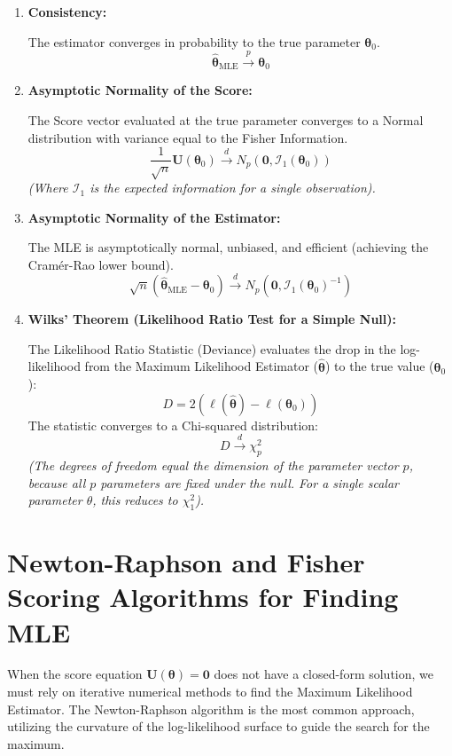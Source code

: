 \documentclass[
  letterpaper,
  DIV=11,
  numbers=noendperiod]{scrreprt}
\renewcommand{\[}{\begin{equation}}
\renewcommand{\]}{\end{equation}}
\theoremstyle{definition}
\theoremstyle{plain}
\theoremstyle{plain}
\theoremstyle{plain}
\theoremstyle{definition}
\theoremstyle{plain}
\theoremstyle{remark}
\begin{document}
\begin{enumerate}
\def\labelenumi{\arabic{enumi}.}
\item
  \textbf{Consistency:}

  The estimator converges in probability to the true parameter
  \(\boldsymbol{\theta}_0\). \[
   \hat{\boldsymbol{\theta}}_{\text{MLE}} \xrightarrow{p} \boldsymbol{\theta}_0
   \]
\item
  \textbf{Asymptotic Normality of the Score:}

  The Score vector evaluated at the true parameter converges to a Normal
  distribution with variance equal to the Fisher Information. \[
   \frac{1}{\sqrt{n}} \mathbf{U}(\boldsymbol{\theta}_0) \xrightarrow{d} N_p(\mathbf{0}, \mathcal{I}_1(\boldsymbol{\theta}_0))
   \] \emph{(Where \(\mathcal{I}_1\) is the expected information for a
  single observation).}
\item
  \textbf{Asymptotic Normality of the Estimator:}

  The MLE is asymptotically normal, unbiased, and efficient (achieving
  the Cramér-Rao lower bound). \[
   \sqrt{n}(\hat{\boldsymbol{\theta}}_{\text{MLE}} - \boldsymbol{\theta}_0) \xrightarrow{d} N_p(\mathbf{0}, \mathcal{I}_1(\boldsymbol{\theta}_0)^{-1})
   \]
\item
  \textbf{Wilks' Theorem (Likelihood Ratio Test for a Simple Null):}

  The Likelihood Ratio Statistic (Deviance) evaluates the drop in the
  log-likelihood from the Maximum Likelihood Estimator
  (\(\hat{\boldsymbol{\theta}}\)) to the true value
  (\(\boldsymbol{\theta}_0\)): \[
   D = 2 \left( \ell(\hat{\boldsymbol{\theta}}) - \ell(\boldsymbol{\theta}_0) \right)
   \] The statistic converges to a Chi-squared distribution: \[
   D \xrightarrow{d} \chi^2_{p}
   \] \emph{(The degrees of freedom equal the dimension of the parameter
  vector \(p\), because all \(p\) parameters are fixed under the null.
  For a single scalar parameter \(\theta\), this reduces to
  \(\chi^2_1\)).}
\end{enumerate}

\section{Newton-Raphson and Fisher Scoring Algorithms for Finding
MLE}\label{newton-raphson-and-fisher-scoring-algorithms-for-finding-mle}

When the score equation \(\mathbf{U}(\boldsymbol{\theta}) = \mathbf{0}\)
does not have a closed-form solution, we must rely on iterative
numerical methods to find the Maximum Likelihood Estimator. The
Newton-Raphson algorithm is the most common approach, utilizing the
curvature of the log-likelihood surface to guide the search for the
maximum.
\end{document}
